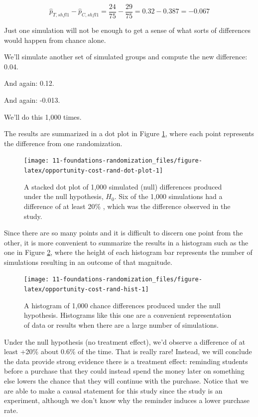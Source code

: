 \documentclass[
  10pt,
  openany]{book}
\begin{document}
\[\hat{p}_{T, shfl1} - \hat{p}_{C, shfl1} = \frac{24}{75} - \frac{29}{75} = 0.32 - 0.387 = - 0.067\]

Just one simulation will not be enough to get a sense of what sorts of differences would happen from chance alone.

We'll simulate another set of simulated groups and compute the new difference: 0.04.

And again: 0.12.

And again: -0.013.

We'll do this 1,000 times.

The results are summarized in a dot plot in Figure \ref{fig:opportunity-cost-rand-dot-plot}, where each point represents the difference from one randomization.

\begin{figure}[h]

{\centering \texttt{[image: 11-foundations-randomization\_files/figure-latex/opportunity-cost-rand-dot-plot-1]} 

}

\caption{A stacked dot plot of 1,000 simulated (null) differences produced under the null hypothesis, \(H_0.\) Six of the 1,000 simulations had a difference of at least 20\% , which was the difference observed in the study.}\label{fig:opportunity-cost-rand-dot-plot}
\end{figure}



Since there are so many points and it is difficult to discern one point from the other, it is more convenient to summarize the results in a histogram such as the one in Figure \ref{fig:opportunity-cost-rand-hist}, where the height of each histogram bar represents the number of simulations resulting in an outcome of that magnitude.

\begin{figure}[h]

{\centering \texttt{[image: 11-foundations-randomization\_files/figure-latex/opportunity-cost-rand-hist-1]} 

}

\caption{A histogram of 1,000 chance differences produced under the null hypothesis. Histograms like this one are a convenient representation of data or results when there are a large number of simulations.}\label{fig:opportunity-cost-rand-hist}
\end{figure}

Under the null hypothesis (no treatment effect), we'd observe a difference of at least +20\% about 0.6\% of the time.
That is really rare!
Instead, we will conclude the data provide strong evidence there is a treatment effect: reminding students before a purchase that they could instead spend the money later on something else lowers the chance that they will continue with the purchase.
Notice that we are able to make a causal statement for this study since the study is an experiment, although we don't know why the reminder induces a lower purchase rate.
\end{document}
